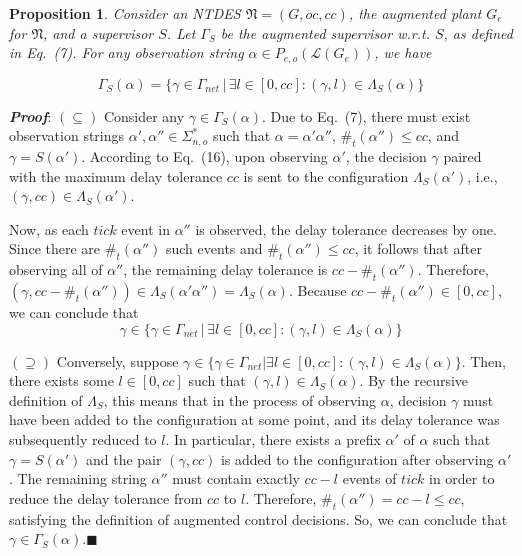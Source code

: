 \documentclass[journal,twocolumn,web]{IEEEtran}
\newtheorem{proposition}{Proposition}
\begin{document}
	 		\begin{proposition}\label{nn1}
	 			Consider an NTDES $\mathfrak{N}=(G,oc,cc)$, the augmented plant $G_e$ for $\mathfrak{N}$, and a supervisor $S$. Let $\Gamma_S$ be the augmented supervisor w.r.t. $S$, as defined in Eq.~(7). For any observation string $\alpha\in P_{e,o}(\mathcal{L}(G_e))$, we have
	 		\end{proposition}
	 		\begin{equation*}\label{cbd3}
	 			\Gamma_S(\alpha) = \{\gamma \in \Gamma_{net} \,|\, \exists l \in [0, cc] : (\gamma, l) \in \Lambda_S(\alpha)\}
	 		\end{equation*}
	 		
	 		
	 		\textbf{\emph{Proof}}: 
	 			$(\subseteq)$ Consider any $\gamma\in\Gamma_{S}(\alpha)$. Due to Eq.~(7), there must exist observation strings $\alpha',\alpha''\in\Sigma_{n,o}^*$ such that $\alpha=\alpha'\alpha''$, $\#_t(\alpha'')\le cc$, and $\gamma=S(\alpha')$. According to Eq.~(16), upon observing $\alpha'$, the decision $\gamma$ paired with the maximum delay tolerance $cc$ is sent to the configuration $\Lambda_S(\alpha')$, i.e., $(\gamma,cc)\in\Lambda_S(\alpha')$.
	 			
	 			
	 			
	 			Now, as each $tick$ event in $\alpha''$ is observed, the delay tolerance decreases by one. Since there are $\#_t(\alpha'')$ such events and $\#_t(\alpha'') \leq cc$, it follows that after observing all of $\alpha''$, the remaining delay tolerance is $cc - \#_t(\alpha'')$. Therefore, $(\gamma, cc - \#_t(\alpha'')) \in \Lambda_S(\alpha'\alpha'') = \Lambda_S(\alpha)$. Because $cc - \#_t(\alpha'') \in [0, cc]$, we can conclude that 
	 				\begin{equation*}  
	 				\gamma \in \{\gamma \in \Gamma_{net} \,|\, \exists l \in [0, cc] : (\gamma, l) \in \Lambda_S(\alpha)\}
	 				\end{equation*}  
	 			
	 		
	 			$(\supseteq)$ Conversely, suppose $\gamma \in \{\gamma \in \Gamma_{net}|\exists l \in [0, cc] : (\gamma, l) \in \Lambda_S(\alpha)\}$.   
	 			Then, there exists some $l \in [0, cc]$ such that $(\gamma, l) \in \Lambda_S(\alpha)$.   
	 			By the recursive definition of $\Lambda_S$, this means that in the process of observing $\alpha$, decision $\gamma$ must have been added to the configuration at some point, and its delay tolerance was subsequently reduced to $l$.   
	 			In particular, there exists a prefix $\alpha'$ of $\alpha$ such that $\gamma = S(\alpha')$ and the pair $(\gamma, cc)$ is added to the configuration after observing $\alpha'$.   
	 			The remaining string $\alpha''$ must contain exactly $cc - l$ events of $tick$ in order to reduce the delay tolerance from $cc$ to $l$.   
	 			Therefore, $\#_t(\alpha'') = cc - l \leq cc$, satisfying the definition of augmented control decisions.   
	 			So, we can conclude that $\gamma \in \Gamma_S(\alpha)$.\hfill$\blacksquare$
	 	
\end{document}
